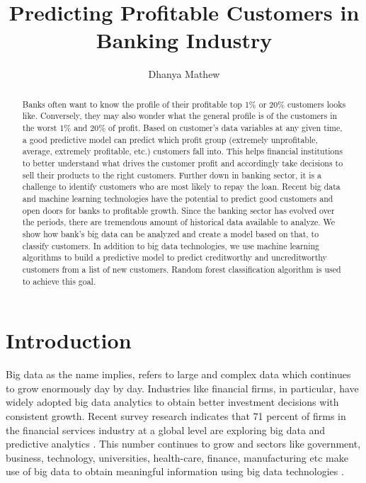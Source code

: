 \documentclass[sigconf]{acmart}
\begin{document}
\title{Predicting Profitable Customers in Banking Industry}


\author{Dhanya Mathew}


\renewcommand{\shortauthors}{G. v. Laszewski}


\begin{abstract}
Banks often want to know the profile of their profitable top 1\% or 20\% customers looks like. Conversely, they may also wonder what the general profile is of the customers in the worst 1\% and 20\% of profit. Based on customer's data variables at any given time, a good predictive model can predict which profit group (extremely unprofitable, average, extremely profitable, etc.) customers fall into. This helps financial institutions to better understand what drives the customer profit and accordingly take decisions to sell their products to the right customers. Further down in banking sector, it is a challenge to identify customers who are most likely to repay the loan. Recent big data and machine learning technologies have the potential to predict good customers and open doors for banks to profitable growth. Since the banking sector has evolved over the periods, there are tremendous amount of historical data available to analyze. We show how bank's big data can be analyzed and create a model based on that, to classify customers. In addition to big data technologies, we use machine learning algorithms to build a predictive model to predict creditworthy and uncreditworthy customers from a list of new customers. Random forest classification algorithm is used to achieve this goal.

\end{abstract}



\maketitle



\section{Introduction}

Big data as the name implies, refers to large and complex data which continues to grow enormously day by day. Industries like financial firms, in particular, have widely adopted big data analytics to obtain better investment decisions with consistent growth. Recent survey research indicates that 71 percent of firms in the financial services industry at a global level are exploring big data and predictive analytics \cite{accenture-next-generation-financial}. This number continues to grow and sectors like government, business, technology, universities, health-care, finance, manufacturing etc make use of big data to obtain meaningful information using big data technologies \cite{wiki-bigdata}. 
\end{document}
